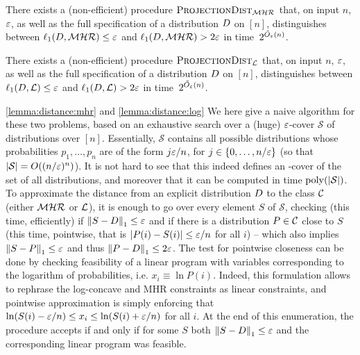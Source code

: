 \begin{lemma}[MHR]\label{lemma:distance:mhr}
There exists a (non-efficient) procedure $\estimdist[\classmhr]$ that, on input $n$, $\eps$, as well as the full specification of a distribution $\D$ on $[n]$, distinguishes between $\lp[1](\D,\classmhr) \leq \eps$ and $\lp[1](\D,\classmhr)>2\eps$ in time~$2^{\tilde{O}_\eps(n)}$.
\end{lemma}
\begin{lemma}\label{lemma:distance:log}
There exists a (non-efficient) procedure $\estimdist[\classlog]$ that, on input $n$, $\eps$, as well as the full specification of a distribution $\D$ on $[n]$, distinguishes between $\lp[1](\D,\classlog) \leq \eps$ and $\lp[1](\D,\classlog)>2\eps$ in time~$2^{\tilde{O}_\eps(n)}$.
\end{lemma}
\begin{proofof}{\cref{lemma:distance:mhr} and \cref{lemma:distance:log}}
We here give a naive algorithm for these two problems, based on an exhaustive search over a (huge) $\eps$-cover $\mathcal{S}$ of distributions over $[n]$. Essentially, $\mathcal{S}$ contains all possible distributions whose probabilities $p_1,\dots,p_n$ are of the form $j\eps/n$, for $j\in\{0,\dots,n/\eps\}$ (so that $\abs{\mathcal{S}} = \bigO{(n/\eps)^{n}}$). It is not hard to see that this indeed defines an \eps-cover of the set of all distributions, and moreover that it can be computed in time $\poly(\abs{\mathcal{S}})$. To approximate the distance from an explicit distribution $\D$ to the class $\class$ (either $\classmhr$ or $\classlog$), it is enough to go over every element $S$ of $\mathcal{S}$, checking (this time, efficiently) if $\normone{S-\D}\leq \eps$ and if there is a distribution $P\in\class$ close to $S$ (this time, pointwise, that is $\abs{P(i)-S(i)} \leq \eps/n$ for all $i$) -- which also implies $\normone{S-P}\leq \eps$ and thus $\normone{P-\D}\leq 2\eps$. The test for pointwise closeness can be done by checking feasibility of a linear program with variables corresponding to the logarithm of probabilities, i.e. $x_i \equiv \ln P(i)$. Indeed, this formulation allows to rephrase the log-concave and MHR constraints as linear constraints, and pointwise approximation is simply enforcing that $\ln(S(i)-\eps/n) \leq x_i \leq \ln(S(i)+\eps/n)$ for all $i$. At the end of this enumeration, the procedure accepts if and only if for some $S$ both $\normone{S-\D}\leq \eps$ and the corresponding linear program was feasible.
\end{proofof}

